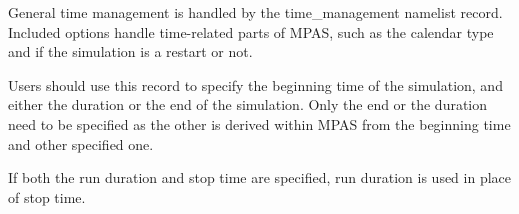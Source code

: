 General time management is handled by the time\_management namelist record.
Included options handle time-related parts of MPAS, such as the calendar type and if the simulation is a restart or not.

Users should use this record to specify the beginning time of the simulation,
and either the duration or the end of the simulation. Only the end or the
duration need to be specified as the other is derived within MPAS from the
beginning time and other specified one.

If both the run duration and stop time are specified, run duration is used in place of stop time.

